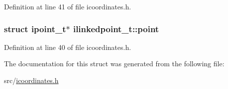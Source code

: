 Definition at line 41 of file icoordinates.\-h.

\hypertarget{structilinkedpoint__t_ad679b26e2151ec3a4ad7b062679fd3c3}{
\subsubsection[{point}]{\setlength{\rightskip}{0pt plus 5cm}struct {\bf ipoint\-\_\-t}$\ast$ ilinkedpoint\-\_\-t\-::point}}\label{structilinkedpoint__t_ad679b26e2151ec3a4ad7b062679fd3c3}


Definition at line 40 of file icoordinates.\-h.



The documentation for this struct was generated from the following file\-:\begin{DoxyCompactItemize}
\item 
src/\hyperlink{icoordinates_8h}{icoordinates.\-h}\end{DoxyCompactItemize}
